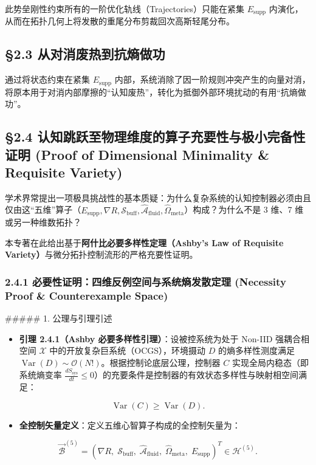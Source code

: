 \documentclass[11pt,a4paper,oneside]{ctexart}
\begin{document}
此势垒刚性约束所有的一阶优化轨线（Trajectories）只能在紧集 $E_{\text{supp}}$ 内演化，从而在拓扑几何上将发散的重尾分布剪裁回次高斯轻尾分布。


\subsection{§2.3 从对消废热到抗熵做功}

通过将状态约束在紧集 $E_{\text{supp}}$ 内部，系统消除了因一阶规则冲突产生的向量对消，将原本用于对消内部摩擦的“认知废热”，转化为抵御外部环境扰动的有用“抗熵做功”。


\subsection{§2.4 认知跳跃至物理维度的算子充要性与极小完备性证明 (Proof of Dimensional Minimality \& Requisite Variety)}

学术界常提出一项极具挑战性的基本质疑：\textit{}为什么复杂系统的认知控制器必须由且仅由这“五维”算子（$E_{\text{supp}}, \nabla R, \mathcal{S}_{\text{buff}}, \hat{\mathcal{A}}_{\text{fluid}}, \hat{\Omega}_{\text{meta}}$）构成？为什么不是 3 维、7 维或另一种维数拓扑？\textit{}


本专著在此给出基于\textbf{阿什比必要多样性定理（Ashby's Law of Requisite Variety）}与微分拓扑控制流形的严格充要性证明。


\subsubsection{2.4.1 必要性证明：四维反例空间与系统熵发散定理 (Necessity Proof \& Counterexample Space)}

\#\#\#\#\# 1. 公理与引理引述

\begin{itemize}\item \textbf{引理 2.4.1（Ashby 必要多样性引理）}：设被控系统为处于 Non-IID 强耦合相空间 $\mathcal{X}$ 中的开放复杂巨系统（OCGS），环境摄动 $D$ 的熵多样性测度满足 $\operatorname{Var}(D) \sim \mathcal{O}(N!)$。根据控制论底层公理，控制器 $C$ 实现全局内稳态（即系统熵变率 $\frac{d S_{\text{sys}}}{dt} \le 0$）的充要条件是控制器的有效状态多样性与映射相空间满足：\end{itemize}
\begin{equation}
\operatorname{Var}(C) \ge \operatorname{Var}(D).
\end{equation}
\begin{itemize}\item \textbf{全控制矢量定义}：定义五维心智算子构成的全控制矢量为：\end{itemize}
\begin{equation}
\vec{\mathcal{B}}^{(5)} = \left( \nabla R, \; \mathcal{S}_{\text{buff}}, \; \hat{\mathcal{A}}_{\text{fluid}}, \; \hat{\Omega}_{\text{meta}}, \; E_{\text{supp}} \right)^T \in \mathcal{H}^{(5)}.
\end{equation}
\end{document}
